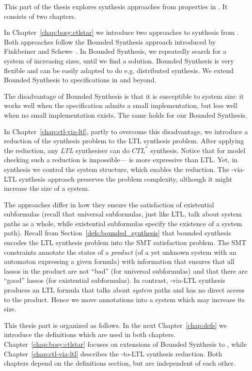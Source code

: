 This part of the thesis explores synthesis approaches from properties in \CTLstar.
It consists of two chapters.

In Chapter~\ref{chap:bosy:ctlstar}
we introduce two approaches to synthesis from \CTLstar.
Both approaches follow the Bounded Synthesis approach
introduced by Finkbeiner and Schewe~\cite{BS}.
In Bounded Synthesis, we repeatedly search for a system of increasing sizes,
until we find a solution.
Bounded Synthesis is very flexible and can be easily adapted
to do e.g. distributed synthesis.
We extend Bounded Synthesis to specifications in \CTLstar and beyond.

The disadvantage of Bounded Synthesis is that it is susceptible to system size:
it works well when the specification admits a small implementation,
but less well when no small implementation exists.
The same holds for our \CTLstar Bounded Synthesis.

In Chapter~\ref{chap:ctl-via-ltl}, partly to overcome this disadvantage,
we introduce a reduction of the \CTLstar synthesis problem to the LTL synthesis problem.
After applying the reduction, any \emph{LTL} synthesiser can do $CTL^*$ synthesis.
Notice that for model checking such a reduction is impossible---%
\CTLstar is more expressive than LTL.
Yet, in synthesis we control the system structure,
which enables the reduction.
The \CTLstar-via-LTL synthesis approach preserves the problem complexity,
although it might increase the size of a system.

The approaches differ in how they ensure the satisfaction of existential \CTLstar subformulas
(recall that universal \CTLstar subformulas, just like LTL, talk about system paths as a whole,
 while existential \CTLstar subformulas specify the existence of a system path).
Recall from Section~\ref{defs:bounded_synthesis} that
bounded synthesis encodes the LTL synthesis problem into the SMT satisfaction problem.
The SMT constraints annotate the states of a \emph{product}
(of a yet unknown system with an automaton expressing a given \CTLstar formula)
with information that ensures that all lassos in the product are not ``bad'' (for universal subformulas)
and that there are ``good'' lassos (for existential subformulas).
In contrast, \CTLstar-via-LTL synthesis produces an LTL formula that
talks about \emph{system} paths and has no direct access to the product.
Hence we move annotations into a system which may increase its size.

This thesis part is organized as follows.
In the next Chapter~\ref{chap:defs} we introduce the definitions
which are used in both chapters.
Chapter~\ref{chap:bosy:ctlstar} focuses on extensions of Bounded Synthesis to \CTLstar,
while Chapter~\ref{chap:ctl-via-ltl} describes the \CTLstar-to-LTL synthesis reduction.
Both chapters depend on the definitions section,
but are independent of each other.


